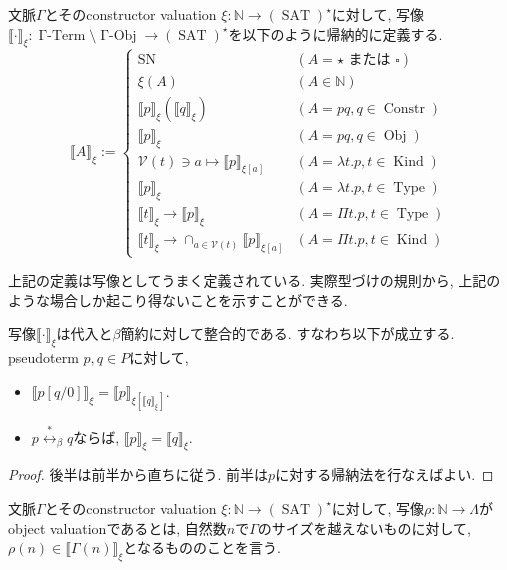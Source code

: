 \documentclass[12pt, titlepage]{ltjsarticle}
\DeclareMathOperator{\SN}{SN}
\DeclareMathOperator{\Obj}{Obj}
\DeclareMathOperator{\Constr}{Constr}
\DeclareMathOperator{\Type}{Type}
\DeclareMathOperator{\Kind}{Kind}
\DeclareMathOperator{\SAT}{SAT}
\DeclareMathOperator{\GTerm}{\Gamma-Term}
\DeclareMathOperator{\GObj}{\Gamma-Obj}
\newcommand{\iprt}[2]{\llbracket {#1} \rrbracket_ {#2}}
\begin{document}
\begin{defn}
 文脈$\Gamma$とそのconstructor valuation $\xi : \mathbb{N} \rightarrow (\SAT)^\star$に対して, 写像$\iprt{\cdot}{\xi} : \GTerm \setminus \GObj \rightarrow (\SAT)^\star$を以下のように帰納的に定義する.
\[
 \iprt{A}{\xi} := \begin{cases}
    \SN & (A = \star \text{ または } \square) \\
    \xi (A) & (A \in \mathbb{N}) \\
    \iprt{p}{\xi} (\iprt{q}{\xi}) & (A = p q, q \in \Constr) \\
    \iprt{p}{\xi} & (A = p q, q \in \Obj) \\
    \mathcal{V} (t) \ni a \mapsto \iprt{p}{\xi[a]} & (A = \lambda t. p, t \in \Kind) \\
    \iprt{p}{\xi} & (A = \lambda t. p, t \in \Type) \\
    \iprt{t}{\xi} \rightarrow \iprt{p}{\xi} & (A = \Pi t. p, t \in \Type) \\
    \iprt{t}{\xi} \rightarrow \cap_{a \in \mathcal{V}(t)} \iprt{p}{\xi[a]} & (A = \Pi t. p, t \in \Kind)
  \end{cases}
\]
\end{defn}
\begin{rem}
 上記の定義は写像としてうまく定義されている. 実際型づけの規則から, 上記のような場合しか起こり得ないことを示すことができる.
\end{rem}
\begin{lem}\label{betap}
 写像$\iprt{\cdot}{\xi}$は代入と$\beta$簡約に対して整合的である. すなわち以下が成立する.
pseudoterm $p, q \in P$に対して, 
 \begin{itemize}
  \item $\iprt{p [q/0]}{\xi} = \iprt{p}{\xi[\iprt{q}{\xi}]}$.
  \item $p \overset{*}{\leftrightarrow}_\beta q$ならば, $\iprt{p}{\xi} = \iprt{q}{\xi}$.
 \end{itemize}
\end{lem}
\begin{proof}
 後半は前半から直ちに従う. 前半は$p$に対する帰納法を行なえばよい.
\end{proof}

\begin{defn}
 文脈$\Gamma$とそのconstructor valuation $\xi : \mathbb{N} \rightarrow (\SAT)^\star$に対して, 写像$\rho : \mathbb{N} \rightarrow \Lambda$がobject valuationであるとは, 自然数$n$で$\Gamma$のサイズを越えないものに対して, $\rho (n) \in \iprt{\Gamma(n)}{\xi}$となるもののことを言う.
\end{defn}
\end{document}
